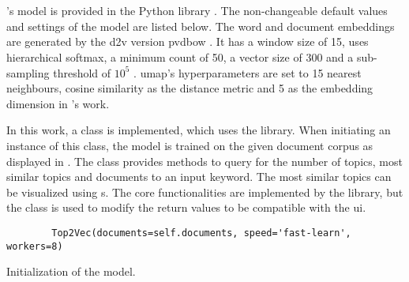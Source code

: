 \section{\topTwovec{}}\label{sec:impl-top2vec}

\citeauthor{Top2Vec2020}'s \topTwovec{} model is provided in the Python library \topTwovec{} \cite{Top2Vec2020}.
The non-changeable default values and settings of the model are listed below.
The word and document embeddings are generated by the \ac{d2v} version \ac{pvdbow} \cite{Top2Vec2020}.
It has a window size of 15, uses hierarchical softmax, a minimum count of 50, a vector size of 300 and a sub-sampling threshold of $10^5$ \cite{Top2Vec2020}.
\ac{umap}'s hyperparameters are set to 15 nearest neighbours, cosine similarity as the distance metric and 5 as the embedding dimension in \citeauthor{Top2Vec2020}'s work.

In this work, a class is implemented, which uses the \topTwovec{} library.
When initiating an instance of this class, the \topTwovec{} model is trained on the given document corpus as displayed in .
The class provides methods to query for the number of topics, 
most similar topics and documents to an input keyword.
The most similar topics can be visualized using \wordcloud{}s.
The core functionalities are implemented by the \topTwovec{} library, but the class is used to modify the return values to be compatible with the \ac{ui}.


\begin{listing}[htp]
    \begin{verbatim}
        Top2Vec(documents=self.documents, speed='fast-learn', workers=8)
    \end{verbatim}
    \caption{Initialization of the \topTwovec{} model.
    }
    \label{lst:init-top2vec}
\end{listing}